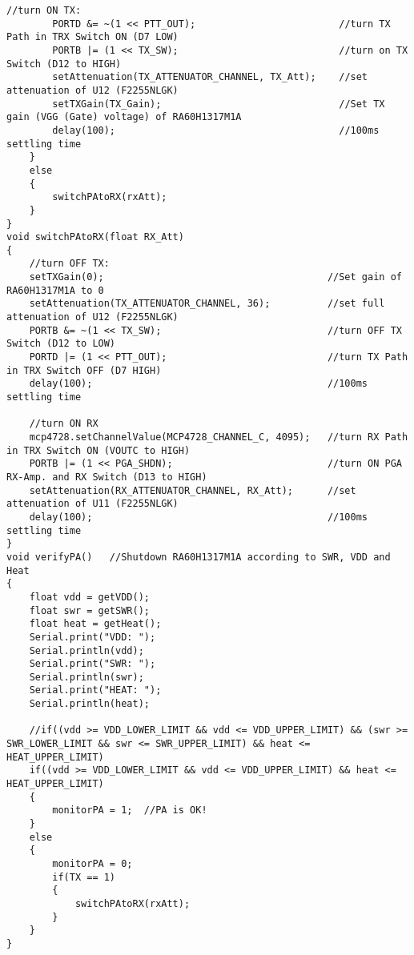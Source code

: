\begin{lstlisting}[language=Arduino]
		//turn ON TX:
		PORTD &= ~(1 << PTT_OUT);                         //turn TX Path in TRX Switch ON (D7 LOW)
		PORTB |= (1 << TX_SW);                            //turn on TX Switch (D12 to HIGH)
		setAttenuation(TX_ATTENUATOR_CHANNEL, TX_Att);    //set attenuation of U12 (F2255NLGK)
		setTXGain(TX_Gain);                               //Set TX gain (VGG (Gate) voltage) of RA60H1317M1A
		delay(100);                                       //100ms settling time
	}
	else
	{
		switchPAtoRX(rxAtt);
	}
}
void switchPAtoRX(float RX_Att)
{
	//turn OFF TX:
	setTXGain(0);                                       //Set gain of RA60H1317M1A to 0
	setAttenuation(TX_ATTENUATOR_CHANNEL, 36);          //set full attenuation of U12 (F2255NLGK)
	PORTB &= ~(1 << TX_SW);                             //turn OFF TX Switch (D12 to LOW)
	PORTD |= (1 << PTT_OUT);                            //turn TX Path in TRX Switch OFF (D7 HIGH)
	delay(100);                                         //100ms settling time
	
	//turn ON RX
	mcp4728.setChannelValue(MCP4728_CHANNEL_C, 4095);   //turn RX Path in TRX Switch ON (VOUTC to HIGH)
	PORTB |= (1 << PGA_SHDN);                           //turn ON PGA RX-Amp. and RX Switch (D13 to HIGH)
	setAttenuation(RX_ATTENUATOR_CHANNEL, RX_Att);      //set attenuation of U11 (F2255NLGK)
	delay(100);                                         //100ms settling time
}
void verifyPA()   //Shutdown RA60H1317M1A according to SWR, VDD and Heat
{
	float vdd = getVDD();
	float swr = getSWR();
	float heat = getHeat();
	Serial.print("VDD: ");
	Serial.println(vdd);
	Serial.print("SWR: ");
	Serial.println(swr);
	Serial.print("HEAT: ");
	Serial.println(heat);
	
	//if((vdd >= VDD_LOWER_LIMIT && vdd <= VDD_UPPER_LIMIT) && (swr >= SWR_LOWER_LIMIT && swr <= SWR_UPPER_LIMIT) && heat <= HEAT_UPPER_LIMIT)
	if((vdd >= VDD_LOWER_LIMIT && vdd <= VDD_UPPER_LIMIT) && heat <= HEAT_UPPER_LIMIT)
	{
		monitorPA = 1;  //PA is OK!
	}
	else
	{
		monitorPA = 0;
		if(TX == 1)
		{
			switchPAtoRX(rxAtt);
		}
	}
}


\end{lstlisting}
